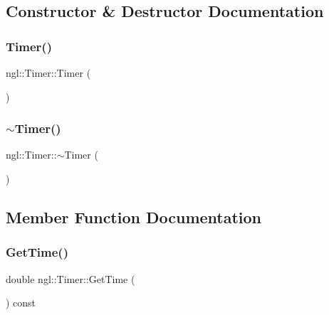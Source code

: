 \subsection{Constructor \& Destructor Documentation}
\mbox{\label{classngl_1_1_timer_a124c8701a5b8717afb4473d36aa70c28}} 
\subsubsection{\texorpdfstring{Timer()}{Timer()}}
{\footnotesize\ttfamily ngl\+::\+Timer\+::\+Timer (\begin{DoxyParamCaption}{ }\end{DoxyParamCaption})\hspace{0.3cm}{\ttfamily [explicit]}}

\mbox{\label{classngl_1_1_timer_ae68f9fcbb71b99c1a9a5590b779e6f92}} 
\subsubsection{\texorpdfstring{$\sim$\+Timer()}{~Timer()}}
{\footnotesize\ttfamily ngl\+::\+Timer\+::$\sim$\+Timer (\begin{DoxyParamCaption}{ }\end{DoxyParamCaption})}



\subsection{Member Function Documentation}
\mbox{\label{classngl_1_1_timer_abe1669142b7197ec95f85190919f8836}} 
\subsubsection{\texorpdfstring{Get\+Time()}{GetTime()}}
{\footnotesize\ttfamily double ngl\+::\+Timer\+::\+Get\+Time (\begin{DoxyParamCaption}{ }\end{DoxyParamCaption}) const}

